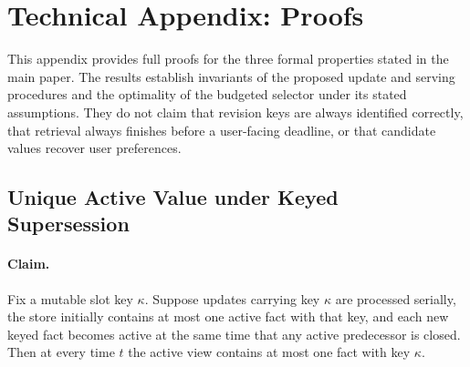 \documentclass[letterpaper]{article} %
\begin{document}


\newpage

\appendix

\section{Technical Appendix: Proofs}

This appendix provides full proofs for the three formal properties stated in the main paper. The results establish invariants of the proposed update and serving procedures and the optimality of the budgeted selector under its stated assumptions. They do not claim that revision keys are always identified correctly, that retrieval always finishes before a user-facing deadline, or that candidate values recover user preferences.

\subsection{Unique Active Value under Keyed Supersession}

\paragraph{Claim.} Fix a mutable slot key $\kappa$. Suppose updates carrying key $\kappa$ are processed serially, the store initially contains at most one active fact with that key, and each new keyed fact becomes active at the same time that any active predecessor is closed. Then at every time $t$ the active view contains at most one fact with key $\kappa$.
\end{document}
